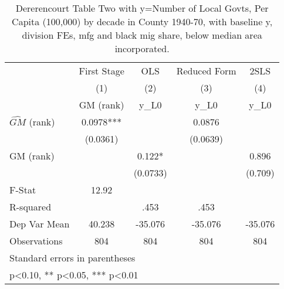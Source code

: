 \begin{table}[htbp]\centering
\def\sym#1{\ifmmode^{#1}\else\(^{#1}\)\fi}
\caption{Dererencourt Table Two with y=Number of Local Govts, Per Capita (100,000) by decade in County 1940-70, with baseline y, division FEs, mfg and black mig share, below median area incorporated.}
\begin{tabular}{l*{4}{c}}
\toprule
                    & First Stage   &         OLS   &Reduced Form   &        2SLS   \\
                    &\multicolumn{1}{c}{(1)}&\multicolumn{1}{c}{(2)}&\multicolumn{1}{c}{(3)}&\multicolumn{1}{c}{(4)}\\
                    &\multicolumn{1}{c}{GM  (rank)}&\multicolumn{1}{c}{y\_L0}&\multicolumn{1}{c}{y\_L0}&\multicolumn{1}{c}{y\_L0}\\
\midrule
$\hat{GM}$ (rank)   &      0.0978***&               &      0.0876   &               \\
                    &    (0.0361)   &               &    (0.0639)   &               \\
\addlinespace
GM  (rank)          &               &       0.122*  &               &       0.896   \\
                    &               &    (0.0733)   &               &     (0.709)   \\
\midrule
F-Stat              &       12.92   &               &               &               \\
R-squared           &               &        .453   &        .453   &               \\
Dep Var Mean        &      40.238   &     -35.076   &     -35.076   &     -35.076   \\
Observations        &         804   &         804   &         804   &         804   \\
\bottomrule
\multicolumn{5}{l}{\footnotesize Standard errors in parentheses}\\
\multicolumn{5}{l}{\footnotesize * p<0.10, ** p<0.05, *** p<0.01}\\
\end{tabular}
\end{table}
